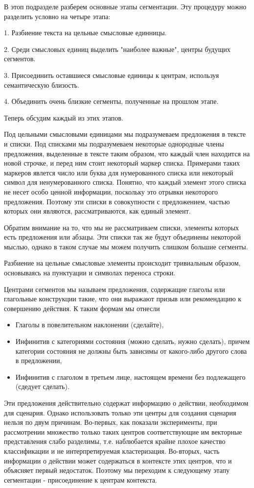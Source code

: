 \documentclass[12pt]{article}
\begin{document}
В этоп подразделе разберем основные этапы сегментации. Эту процедуру можно разделить условно на четыре этапа:

1. Разбиение текста на цельные смысловые единницы.

2. Среди смысловых единиц выделить "наиболее важные", центры будущих сегментов.

3. Присоединить оставшиеся смысловые единицы к центрам, используя семантическую близость.

4. Объединить очень близкие сегменты, полученные на прошлом этапе.

Теперь обсудим каждый из этих этапов.

Под цельными смысловыми единицами мы подразумеваем предложения в тексте и списки. Под списками мы подразумеваем некоторые однородные члены предложения, выделенные в тексте таким образом, что каждый член находится на новой строчке, и перед ним стоит некоторый маркер списка. Примерами таких маркеров явлется число или буква для нумерованного списка или некоторый символ для ненумерованного списка. Понятно, что каждый элемент этого списка не несет особо ценной информации, поскольку это отрывки некоторого предложения. Поэтому эти списки в совокупности с предложением, частью которых они являются, рассматриваются, как единый элемент.

Обратим внимание на то, что мы не рассматриваем списки, элементы которых есть предложения или абзацы. Эти списки так же будут объединены некоторой мыслью, однако в таком случае мы можем получить слишком большие сегменты.

Разбиение на цельные смысловые элементы происходит тривиальным образом, основываясь на пунктуации и символах переноса строки.

Центрами сегментов мы называем предложения, содержащие глаголы или глагольные конструкции такие, что они выражают призыв или рекомендацию к совершению действия. К таким формам мы отнесли
\begin{itemize}
\item Глаголы в повелительном наклонении (сделайте),
\item Инфинитив с  категориями состояния (можно сделать, нужно сделать), причем категории состояния не должны быть зависимы от какого-либо другого слова в предложении,
\item Инфинитив с глаголом в третьем лице, настоящем времени без подлежащего (сдедует сделать).
\end{itemize}

Эти предложения действительно содержат информацию о действии, необходимом для сценария. Однако использовать только эти центры для создания сценария нельзя по двум причинам. Во-первых, как показали эксперименты, при рассмотрении множество только таких центров соответствующие им векторные представления слабо разделимы, т.е. наблюбается крайне плохое качество классификации и не интерпретируемая кластеризация. Во-вторых, часть информации о действии может содержаться в контексте этих центров, что и объясняет первый недостаток. Поэтому мы переходим к следующему этапу сегментации - присоединение к центрам контекста.
\end{document}
